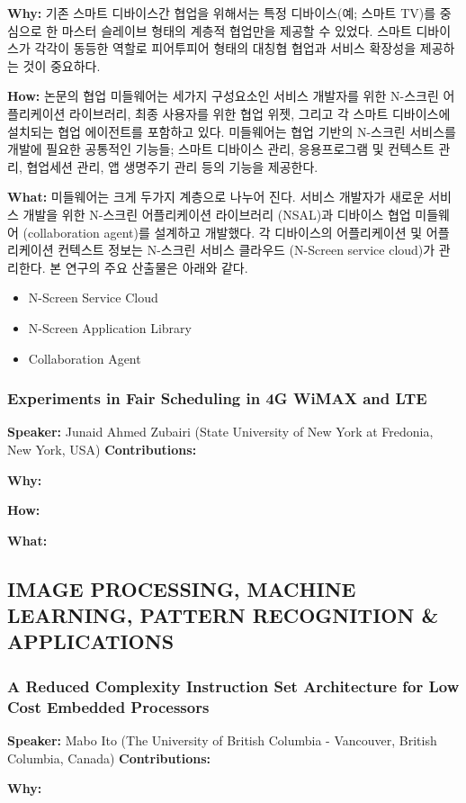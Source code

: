 \documentclass[twocolumn]{article}
\newcommand{\bi}{\begin{itemize}}
\newcommand{\ei}{\end{itemize}}
\newcommand{\ii}{\item}
\begin{document}
\noindent
\textbf{Why:} 기존 스마트 디바이스간 협업을 위해서는 특정 디바이스(예; 스마트 TV)를 중심으로 한 마스터 슬레이브 형태의 계층적 협업만을 제공할 수 있었다. 스마트 디바이스가 각각이 동등한 역할로 피어투피어 형태의 대칭협 협업과 서비스 확장성을 제공하는 것이 중요하다. 

\noindent
\textbf{How:}  논문의 협업 미들웨어는 세가지 구성요소인 서비스 개발자를 위한 N-스크린 어플리케이션 라이브러리, 최종 사용자를 위한 협업 위젯, 그리고 각 스마트 디바이스에 설치되는 협업 에이전트를 포함하고 있다. 미들웨어는 협업 기반의 N-스크린 서비스를 개발에 필요한 공통적인 기능들; 스마트 디바이스 관리, 응용프로그램 및 컨텍스트 관리, 협업세션 관리, 앱 생명주기 관리 등의 기능을 제공한다.

\noindent
\textbf{What:} 미들웨어는 크게 두가지 계층으로 나누어 진다. 서비스 개발자가 새로운 서비스 개발을 위한 N-스크린 어플리케이션 라이브러리 (NSAL)과 디바이스 협업 미들웨어 (collaboration agent)를 설계하고 개발했다. 각 디바이스의 어플리케이션 및 어플리케이션 컨텍스트 정보는 N-스크린 서비스 클라우드 (N-Screen service cloud)가 관리한다. 본 연구의 주요 산출물은 아래와 같다.
\bi
\ii N-Screen Service Cloud
\ii N-Screen Application Library
\ii Collaboration Agent
\ei

\subsubsection{Experiments in Fair Scheduling in 4G WiMAX and LTE}
\textbf{Speaker:} Junaid Ahmed Zubairi (State University of New York at Fredonia, New York, USA)
\noindent
\textbf{Contributions:}  

\noindent
\textbf{Why:}  

\noindent
\textbf{How:}  

\noindent
\textbf{What:}  

\subsection{IMAGE PROCESSING, MACHINE LEARNING, PATTERN RECOGNITION \& APPLICATIONS}
\subsubsection{A Reduced Complexity Instruction Set Architecture for Low Cost Embedded Processors}
\textbf{Speaker:} Mabo Ito (The University of British Columbia - Vancouver, British Columbia, Canada)
\noindent
\textbf{Contributions:}  

\noindent
\textbf{Why:}  
\end{document}
